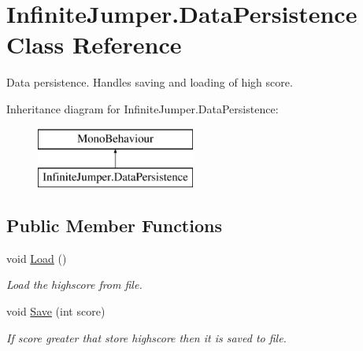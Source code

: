 \hypertarget{class_infinite_jumper_1_1_data_persistence}{}\section{Infinite\+Jumper.\+Data\+Persistence Class Reference}
\label{class_infinite_jumper_1_1_data_persistence}


Data persistence. Handles saving and loading of high score.  


Inheritance diagram for Infinite\+Jumper.\+Data\+Persistence\+:\begin{figure}[H]
\begin{center}
\leavevmode
\includegraphics[height=2.000000cm]{class_infinite_jumper_1_1_data_persistence}
\end{center}
\end{figure}
\subsection*{Public Member Functions}
\begin{DoxyCompactItemize}
\item 
void \hyperlink{class_infinite_jumper_1_1_data_persistence_ae30fabadd77b6a6066dfd2fc3f5caf99}{Load} ()
\begin{DoxyCompactList}\small\item\em Load the highscore from file. \end{DoxyCompactList}\item 
void \hyperlink{class_infinite_jumper_1_1_data_persistence_a1409d53905d26fe461bb9c61e309b602}{Save} (int score)
\begin{DoxyCompactList}\small\item\em If score greater that store highscore then it is saved to file. \end{DoxyCompactList}\end{DoxyCompactItemize}
